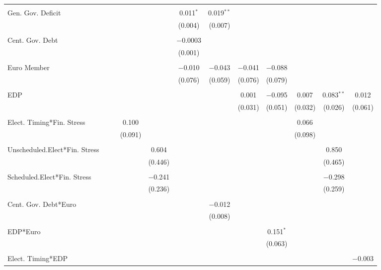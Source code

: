 \begin{table}[!htbp]
\begin{tabular}{@{\extracolsep{5pt}}lccccccccccc}
  & & & & & & & & & & & \\ 
 Gen. Gov. Deficit &  &  &  &  & 0.011$^{*}$ & 0.019$^{**}$ &  &  &  &  &  \\ 
  &  &  &  &  & (0.004) & (0.007) &  &  &  &  &  \\ 
  & & & & & & & & & & & \\ 
 Cent. Gov. Debt &  &  &  &  & $-$0.0003 &  &  &  &  &  &  \\ 
  &  &  &  &  & (0.001) &  &  &  &  &  &  \\ 
  & & & & & & & & & & & \\ 
 Euro Member &  &  &  &  & $-$0.010 & $-$0.043 & $-$0.041 & $-$0.088 &  &  &  \\ 
  &  &  &  &  & (0.076) & (0.059) & (0.076) & (0.079) &  &  &  \\ 
  & & & & & & & & & & & \\ 
 EDP &  &  &  &  &  &  & 0.001 & $-$0.095 & 0.007 & 0.083$^{**}$ & 0.012 \\ 
  &  &  &  &  &  &  & (0.031) & (0.051) & (0.032) & (0.026) & (0.061) \\ 
  & & & & & & & & & & & \\ 
 Elect. Timing*Fin. Stress &  &  & 0.100 &  &  &  &  &  & 0.066 &  &  \\ 
  &  &  & (0.091) &  &  &  &  &  & (0.098) &  &  \\ 
  & & & & & & & & & & & \\ 
 Unscheduled.Elect*Fin. Stress &  &  &  & 0.604 &  &  &  &  &  & 0.850 &  \\ 
  &  &  &  & (0.446) &  &  &  &  &  & (0.465) &  \\ 
  & & & & & & & & & & & \\ 
 Scheduled.Elect*Fin. Stress &  &  &  & $-$0.241 &  &  &  &  &  & $-$0.298 &  \\ 
  &  &  &  & (0.236) &  &  &  &  &  & (0.259) &  \\ 
  & & & & & & & & & & & \\ 
 Cent. Gov. Debt*Euro &  &  &  &  &  & $-$0.012 &  &  &  &  &  \\ 
  &  &  &  &  &  & (0.008) &  &  &  &  &  \\ 
  & & & & & & & & & & & \\ 
 EDP*Euro &  &  &  &  &  &  &  & 0.151$^{*}$ &  &  &  \\ 
  &  &  &  &  &  &  &  & (0.063) &  &  &  \\ 
  & & & & & & & & & & & \\ 
 Elect. Timing*EDP &  &  &  &  &  &  &  &  &  &  & $-$0.003 \\ 

\end{tabular}
\end{table}
